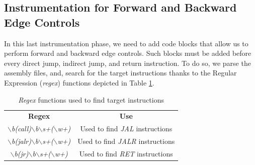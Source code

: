 \subsection{Instrumentation for Forward and Backward Edge Controls}
\label{subsec:project_instrcontrols}

In this last instrumentation phase, we need to add code blocks that allow us to perform
forward and backward edge controls. Such blocks must be added before every
direct jump, indirect jump, and return instruction. To do so, we parse the
assembly files, and, search for the target instructions thanks to the Regular
Expression (\textit{regex}) functions depicted in Table \ref{tab:regexes}.

\begin{table}
  \centering
  \begin{tabular}{|c|c|}
    \hline
    \textbf{Regex}                                                                      & \textbf{Use}                            \\
    \hhline{==} \textit{$\backslash$b(call)$\backslash$b$\backslash$s+($\backslash$w+)} & Used to find \textit{JAL} instructions  \\
    \hline
    \textit{$\backslash$b(jalr)$\backslash$b$\backslash$s+($\backslash$w+)}             & Used to find \textit{JALR} instructions \\
    \hline
    \textit{$\backslash$b(jr)$\backslash$b$\backslash$s+($\backslash$w+)}               & Used to find \textit{RET} instructions  \\
    \hline
  \end{tabular}
  \caption{\textit{Regex} functions used to find target instructions}
  \label{tab:regexes}
\end{table}

